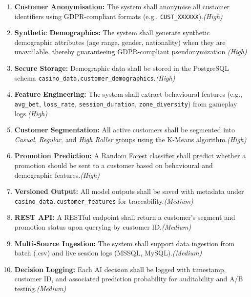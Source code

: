 \documentclass[12pt,a4paper]{report}
\begin{document}
\begin{enumerate}[label=FR\arabic*:]
  \item \textbf{Customer Anonymisation:} The system shall anonymise all customer identifiers using GDPR-compliant formats (e.g., \texttt{CUST\_XXXXXX}).\hfill \textit{(High)}
  
  \item \textbf{Synthetic Demographics:} The system shall generate synthetic demographic attributes (age range, gender, nationality) when they are unavailable, thereby guaranteeing GDPR-compliant pseudonymization \hfill \textit{(High)}
  
  \item \textbf{Secure Storage:} Demographic data shall be stored in the PostgreSQL schema \texttt{casino\_data.customer\_demographics}.\hfill \textit{(High)}
  
  \item \textbf{Feature Engineering:} The system shall extract behavioural features (e.g., \texttt{avg\_bet}, \texttt{loss\_rate}, \texttt{session\_duration}, \texttt{zone\_diversity}) from gameplay logs.\hfill \textit{(High)}
  
  \item \textbf{Customer Segmentation:} All active customers shall be segmented into \textit{Casual}, \textit{Regular}, and \textit{High Roller} groups using the K-Means algorithm.\hfill \textit{(High)}
  
  \item \textbf{Promotion Prediction:} A Random Forest classifier shall predict whether a promotion should be sent to a customer based on behavioural and demographic features.\hfill \textit{(High)}
  
  \item \textbf{Versioned Output:} All model outputs shall be saved with metadata under \texttt{casino\_data.customer\_features} for traceability.\hfill \textit{(Medium)}
  
  \item \textbf{REST API:} A RESTful endpoint shall return a customer's segment and promotion status upon querying by customer ID.\hfill \textit{(Medium)}
  
  \item \textbf{Multi-Source Ingestion:} The system shall support data ingestion from batch (.csv) and live session logs (MSSQL, MySQL).\hfill \textit{(Medium)}
  
  \item \textbf{Decision Logging:} Each AI decision shall be logged with timestamp, customer ID, and associated prediction probability for auditability and A/B testing.\hfill \textit{(Medium)}
\end{enumerate}
\end{document}
